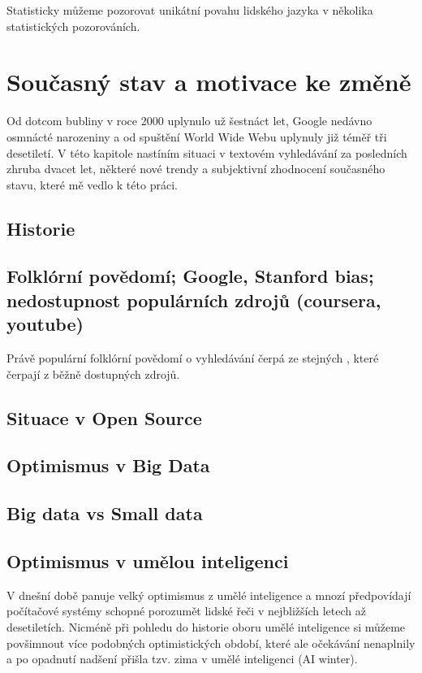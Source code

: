 \documentclass[12pt]{article}
\begin{document}
Statisticky můžeme pozorovat unikátní povahu lidského jazyka v několika statistických pozorováních.

\section{Současný stav a motivace ke změně}
Od dotcom bubliny v roce 2000 uplynulo už šestnáct let, Google nedávno
osmnácté narozeniny a od spuštění World Wide Webu uplynuly již téměř tři
desetiletí. V této kapitole nastíním situaci v textovém vyhledávání za
posledních zhruba dvacet let, některé nové trendy a subjektivní
zhodnocení současného stavu, které mě vedlo k této práci.

\subsection{Historie}

\subsection{Folklórní povědomí; Google, Stanford bias; nedostupnost populárních zdrojů (coursera, youtube)}
Právě populární folklórní povědomí o vyhledávání čerpá ze stejných , které čerpají
z běžně dostupných zdrojů.

\subsection{Situace v Open Source}
\subsection{Optimismus v Big Data}

\subsection{Big data vs Small data}


\subsection{Optimismus v umělou inteligenci}
V dnešní době panuje velký optimismus z umělé inteligence a mnozí
předpovídají počítačové systémy schopné porozumět lidské řeči v
nejbližších letech až desetiletích. Nicméně při pohledu do historie
oboru umělé inteligence si můžeme povšimnout více podobných
optimistických období, které ale očekávání nenaplnily a po opadnutí
nadšení přišla tzv. zima v umělé inteligenci (AI winter). 
\end{document}
